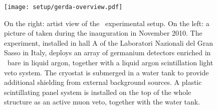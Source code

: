 \begin{figure}
  \centering
  \texttt{[image: setup/gerda-overview.pdf]}
  \caption{%
    On the right: artist view of the \gerda\ experimental setup. On the left: a picture of
    taken during the inauguration in November 2010. The experiment, installed in hall A of
    the Laboratori Nazionali del Gran Sasso in Italy, deploys an array of germanium detectors
    enriched in \gesix\ bare in liquid argon, together with a liquid argon scintillation
    light veto system. The cryostat is submerged in a water tank to provide additional
    shielding from external background sources. A plastic scintillating panel system is
    installed on the top of the whole structure as an active muon veto, together with the
    water tank.
  }\label{fig:setup:overview}
\end{figure}

